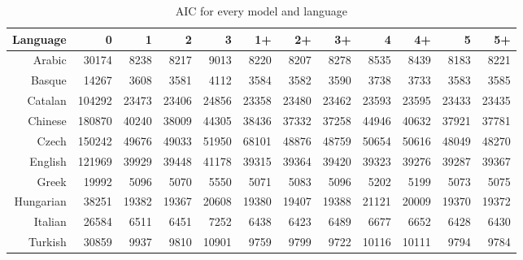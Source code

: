 \documentclass[paper=a4, fontsize=11pt]{scrartcl} %
\begin{document}
\begin{table}
\begin{adjustbox}{center}
\centering
\begin{tabular}{rrrrrrrrrrrr}
 Language & 0 & 1 & 2 & 3 & 1+ & 2+ & 3+ & 4 & 4+ & 5 & 5+ \\ 
  \midrule
Arabic & 30174 & 8238 & 8217 & 9013 & 8220 & 8207 & 8278 & 8535 & 8439 & 8183 & 8221 \\ 
  Basque & 14267 & 3608 & 3581 & 4112 & 3584 & 3582 & 3590 & 3738 & 3733 & 3583 & 3585 \\ 
  Catalan & 104292 & 23473 & 23406 & 24856 & 23358 & 23480 & 23462 & 23593 & 23595 & 23433 & 23435 \\ 
  Chinese & 180870 & 40240 & 38009 & 44305 & 38436 & 37332 & 37258 & 44946 & 40632 & 37921 & 37781 \\ 
  Czech & 150242 & 49676 & 49033 & 51950 & 68101 & 48876 & 48759 & 50654 & 50616 & 48049 & 48270 \\ 
  English & 121969 & 39929 & 39448 & 41178 & 39315 & 39364 & 39420 & 39323 & 39276 & 39287 & 39367 \\ 
  Greek & 19992 & 5096 & 5070 & 5550 & 5071 & 5083 & 5096 & 5202 & 5199 & 5073 & 5075 \\ 
  Hungarian & 38251 & 19382 & 19367 & 20608 & 19380 & 19407 & 19388 & 21121 & 20009 & 19370 & 19372 \\ 
  Italian & 26584 & 6511 & 6451 & 7252 & 6438 & 6423 & 6489 & 6677 & 6652 & 6428 & 6430 \\ 
  Turkish & 30859 & 9937 & 9810 & 10901 & 9759 & 9799 & 9722 & 10116 & 10111 & 9794 & 9784 \\ 
   \bottomrule
\end{tabular}
\end{adjustbox}
\caption{AIC for every model and language}
\label{tab:aic}
\end{table}
\end{document}
